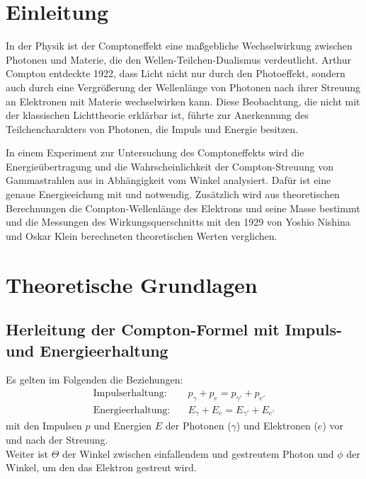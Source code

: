 \documentclass[12pt,a4paper,ngerman]{report}
\begin{document}
	\setcounter{secnumdepth}{3}
	\setcounter{tocdepth}{4}
	\tableofcontents



	\chapter*{Einleitung}
            In der Physik ist der Comptoneffekt eine maßgebliche Wechselwirkung zwischen Photonen und Materie, die den Wellen-Teilchen-Dualismus verdeutlicht. Arthur Compton entdeckte 1922, dass Licht nicht nur durch den Photoeffekt, sondern auch durch eine Vergrößerung der Wellenlänge von Photonen nach ihrer Streuung an Elektronen mit Materie wechselwirken kann. Diese Beobachtung, die nicht mit der klassischen Lichttheorie erklärbar ist, führte zur Anerkennung des Teilchencharakters von Photonen, die Impuls und Energie besitzen.

            In einem Experiment zur Untersuchung des Comptoneffekts wird die Energieübertragung und die Wahrscheinlichkeit der Compton-Streuung von Gammastrahlen aus  in Abhängigkeit vom Winkel analysiert. Dafür ist eine genaue Energieeichung mit  und  notwendig. Zusätzlich wird aus theoretischen Berechnungen die Compton-Wellenlänge des Elektrons und seine Masse bestimmt und die Messungen des Wirkungsquerschnitts mit den 1929 von Yoshio Nishina und Oskar Klein berechneten theoretischen Werten verglichen.


    \chapter{Theoretische Grundlagen}
    	\section{Herleitung der Compton-Formel mit Impuls- und Energieerhaltung}
        	Es gelten im Folgenden die Beziehungen:
				\begin{align}
					\text{Impulserhaltung:} & \quad p_{\gamma} + p_e = p_{\gamma'} + p_{e'} \label{eq:Impulserhaltung} \\
					\text{Energieerhaltung:} & \quad E_{\gamma} + E_e = E_{\gamma'} + E_{e'} \label{eq:Energieerhaltung}
				\end{align}
			mit den Impulsen $p$ und Energien $E$ der Photonen ($\gamma$) und Elektronen ($e$) vor und nach der Streuung.\\
			Weiter ist $\Theta$ der Winkel zwischen einfallendem und gestreutem Photon und $\phi$ der Winkel, um den das Elektron gestreut wird.\\
\end{document}
